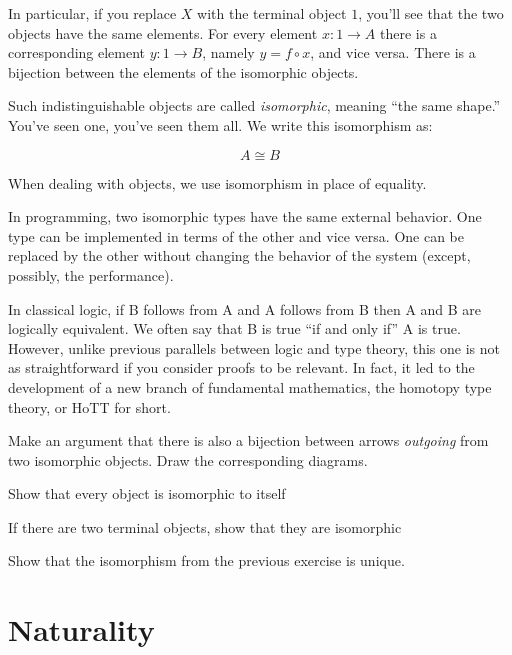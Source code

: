 \documentclass[DaoFP]{subfiles}
\begin{document}
In particular, if you replace $X$ with the terminal object $1$, you'll see that the two objects have the same elements. For every element $x \colon 1 \to A$ there is a corresponding element $y \colon 1 \to B$, namely $y = f \circ x$, and vice versa. There is a bijection between the elements of the isomorphic objects.

Such indistinguishable objects are called \emph{isomorphic}, meaning ``the same shape.'' You've seen one, you've seen them all. We write this isomorphism as:

\[A \cong B\]

When dealing with objects, we use isomorphism in place of equality.

In programming, two isomorphic types have the same external behavior. One type can be implemented in terms of the other and vice versa. One can be replaced by the other without changing the behavior of the system (except, possibly, the performance). 

In classical logic, if B follows from A and A follows from B then A and B are logically equivalent. We often say that B is true ``if and only if'' A is true. However, unlike previous parallels between logic and type theory, this one is not as straightforward if you consider proofs to be relevant. In fact, it led to the development of a new branch of fundamental mathematics, the homotopy type theory, or HoTT for short.

\begin{exercise}
Make an argument that there is also a bijection between arrows \emph{outgoing} from two isomorphic objects. Draw the corresponding diagrams.
\end{exercise}


\begin{exercise}
Show that every object is isomorphic to itself
\end{exercise}

\begin{exercise}
If there are two terminal objects, show that they are isomorphic
\end{exercise}

\begin{exercise}
Show that the isomorphism from the previous exercise is unique.
\end{exercise}

\section{Naturality}
\end{document}
